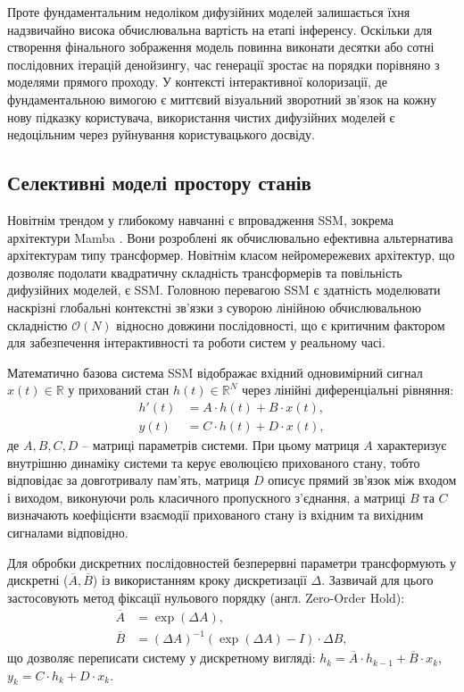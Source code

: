             Проте фундаментальним недоліком дифузійних моделей залишається їхня надзвичайно висока обчислювальна вартість на етапі інференсу.
            Оскільки для створення фінального зображення модель повинна виконати десятки або сотні послідовних ітерацій денойзингу,
            час генерації зростає на порядки порівняно з моделями прямого проходу.
            У контексті інтерактивної колоризації, де фундаментальною вимогою є миттєвий візуальний зворотний зв'язок на кожну нову підказку користувача, використання чистих дифузійних моделей є недоцільним через руйнування користувацького досвіду.
        
        \subsection{Селективні моделі простору станів}
            Новітнім трендом у глибокому навчанні є впровадження SSM, зокрема архітектури Mamba \cite{2023-mamba}.
            Вони розроблені як обчислювально ефективна альтернатива архітектурам типу трансформер.
            Новітнім класом нейромережевих архітектур, що дозволяє подолати квадратичну складність трансформерів та повільність дифузійних моделей, є SSM.
            Головною перевагою SSM є здатність моделювати наскрізні глобальні контекстні зв'язки з суворою лінійною обчислювальною складністю $\mathcal{O}(N)$ відносно довжини послідовності, що є критичним фактором для забезпечення інтерактивності та роботи систем у реальному часі.

            Математично базова система SSM відображає вхідний одновимірний сигнал $x(t) \in \mathbb{R}$ у прихований стан $h(t) \in \mathbb{R}^N$ через лінійні диференціальні рівняння:
            \begin{align*}
                h'(t) &= A \cdot h(t) + B \cdot x(t), \\
                y(t) &= C \cdot h(t) + D \cdot x(t),
            \end{align*}
            де $A, B, C, D$ -- матриці параметрів системи.
            При цьому матриця $A$ характеризує внутрішню динаміку системи та керує еволюцією прихованого стану, тобто відповідає за довготривалу пам'ять, матриця $D$ описує прямий зв'язок між входом і виходом, виконуючи роль класичного пропускного з'єднання, а матриці $B$ та $C$ визначають коефіцієнти взаємодії прихованого стану із вхідним та вихідним сигналами відповідно.

            Для обробки дискретних послідовностей безперервні параметри трансформують у дискретні ($\overline{A}, \overline{B}$) із використанням кроку дискретизації $\Delta$. Зазвичай для цього застосовують метод фіксації нульового порядку (англ. Zero-Order Hold):
            \begin{align*}
                \overline{A} &= \exp(\Delta A), \\
                \overline{B} &= (\Delta A)^{-1}(\exp(\Delta A) - I) \cdot \Delta B,
            \end{align*}
            що дозволяє переписати систему у дискретному вигляді: $h_k = \overline{A} \cdot h_{k-1} + \overline{B} \cdot x_k$, $y_k = C \cdot h_k + D \cdot x_k$.


